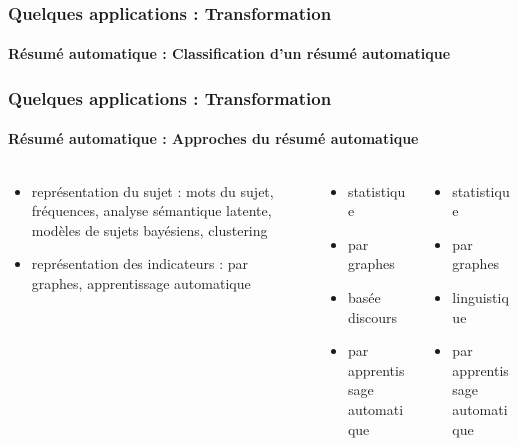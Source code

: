 \documentclass[xcolor=table]{beamer}
\begin{document}
\begin{frame}
	\frametitle{Quelques applications : Transformation}
	\framesubtitle{Résumé automatique : Classification d'un résumé automatique}
\end{frame}

\begin{frame}
	\frametitle{Quelques applications : Transformation}
	\framesubtitle{Résumé automatique : Approches du résumé automatique}
	\begin{columns}
		\begin{column}{0.32\textwidth}
			\begin{block}{\scriptsize\bfseries\cite{12-nenkova-mckeown}}
				\begin{itemize}
					\item représentation du sujet 
					:
					mots du sujet,
					fréquences, 
					analyse sémantique latente, 
					modèles de sujets bayésiens,
					clustering
					\item représentation des indicateurs : 
					par graphes, 
					apprentissage automatique
				\end{itemize}
			\end{block}
		\end{column}
		\begin{column}{0.3\textwidth}
			\begin{block}{\scriptsize\bfseries\cite{12-lloret-palomar}}
				\begin{itemize}
					\item statistique 
					\item par graphes
					\item basée discours
					\item par apprentissage automatique
				\end{itemize}
			\end{block}
		\end{column}
		\begin{column}{0.28\textwidth}
			\begin{block}{\scriptsize\bfseries\cite{19-aries-al}}
				\begin{itemize}
					\item statistique 
					\item par graphes
					\item linguistique 
					\item par apprentissage automatique
				\end{itemize}
			\end{block}
		\end{column}
	\end{columns}
\end{frame}
\end{document}
